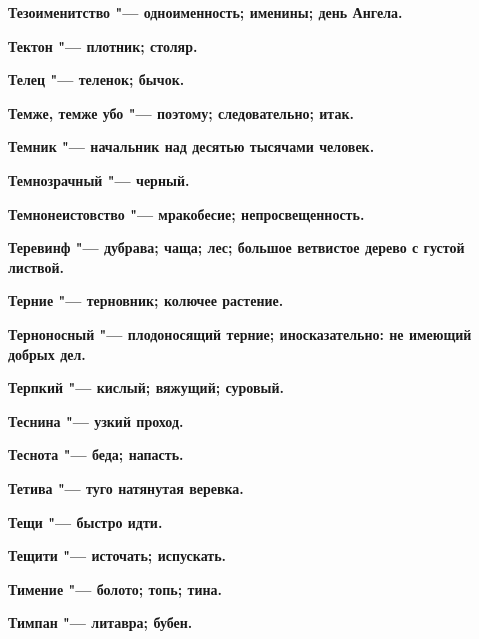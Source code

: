 \begin{multicols}{2}
\bfseries Тезоименитство\normalfont{} "--- одноименность; именины; день Ангела. 




\bfseries Тектон\normalfont{} "--- плотник; столяр. 




\bfseries Телец\normalfont{} "--- теленок; бычок. 




\bfseries Темже, темже убо\normalfont{} "--- поэтому; следовательно; итак. 




\bfseries Темник\normalfont{} "--- начальник над десятью тысячами человек. 




\bfseries Темнозрачный\normalfont{} "--- черный. 




\bfseries Темнонеистовство\normalfont{} "--- мракобесие; непросвещенность. 




\bfseries Теревинф\normalfont{} "--- дубрава; чаща; лес; большое ветвистое дерево с густой листвой. 




\bfseries Терние\normalfont{} "--- терновник; колючее растение. 




\bfseries Терноносный\normalfont{} "--- плодоносящий терние; иносказательно: не имеющий добрых дел. 




\bfseries Терпкий\normalfont{} "--- кислый; вяжущий; суровый. 




\bfseries Теснина\normalfont{} "--- узкий проход. 




\bfseries Теснота\normalfont{} "--- беда; напасть. 




\bfseries Тетива\normalfont{} "--- туго натянутая веревка. 




\bfseries Тещи\normalfont{} "--- быстро идти. 




\bfseries Тещити\normalfont{} "--- источать; испускать. 




\bfseries Тимение\normalfont{} "--- болото; топь; тина. 




\bfseries Тимпан\normalfont{} "--- литавра; бубен. 





\end{multicols}
